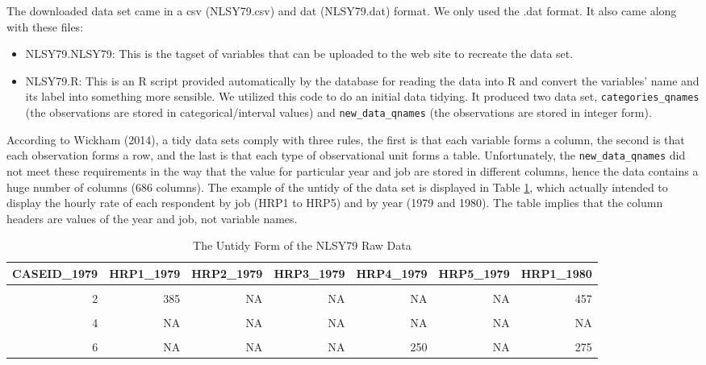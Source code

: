 \documentclass{article}
\begin{document}
The downloaded data set came in a csv (NLSY79.csv) and dat (NLSY79.dat) format. We only used the .dat format. It also came along with these files:

\begin{itemize}
\tightlist
\item
  NLSY79.NLSY79: This is the tagset of variables that can be uploaded to the web site to recreate the data set.
\item
  NLSY79.R: This is an R script provided automatically by the database for reading the data into R and convert the variables' name and its label into something more sensible. We utilized this code to do an initial data tidying. It produced two data set, \texttt{categories\_qnames} (the observations are stored in categorical/interval values) and \texttt{new\_data\_qnames} (the observations are stored in integer form).
\end{itemize}

According to Wickham (2014), a tidy data sets comply with three rules, the first is that each variable forms a column, the second is that each observation forms a row, and the last is that each type of observational unit forms a table. Unfortunately, the \texttt{new\_data\_qnames} did not meet these requirements in the way that the value for particular year and job are stored in different columns, hence the data contains a huge number of columns (686 columns). The example of the untidy of the data set is displayed in Table \ref{tab:untidy-data}, which actually intended to display the hourly rate of each respondent by job (HRP1 to HRP5) and by year (1979 and 1980). The table implies that the column headers are values of the year and job, not variable names.

\begin{table}

\caption{\label{tab:untidy-data}The Untidy Form of the NLSY79 Raw Data}
\centering
\begin{tabular}[t]{r|r|r|r|r|r|r}
\hline
CASEID\_1979 & HRP1\_1979 & HRP2\_1979 & HRP3\_1979 & HRP4\_1979 & HRP5\_1979 & HRP1\_1980\\
\hline
\cellcolor{gray!6}{1} & \cellcolor{gray!6}{328} & \cellcolor{gray!6}{NA} & \cellcolor{gray!6}{NA} & \cellcolor{gray!6}{NA} & \cellcolor{gray!6}{NA} & \cellcolor{gray!6}{NA}\\
\hline
2 & 385 & NA & NA & NA & NA & 457\\
\hline
\cellcolor{gray!6}{3} & \cellcolor{gray!6}{365} & \cellcolor{gray!6}{NA} & \cellcolor{gray!6}{275} & \cellcolor{gray!6}{NA} & \cellcolor{gray!6}{NA} & \cellcolor{gray!6}{397}\\
\hline
4 & NA & NA & NA & NA & NA & NA\\
\hline
\cellcolor{gray!6}{5} & \cellcolor{gray!6}{310} & \cellcolor{gray!6}{375} & \cellcolor{gray!6}{NA} & \cellcolor{gray!6}{NA} & \cellcolor{gray!6}{NA} & \cellcolor{gray!6}{333}\\
\hline
6 & NA & NA & NA & 250 & NA & 275\\
\hline
\end{tabular}
\end{table}
\end{document}
